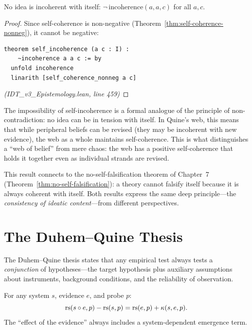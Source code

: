 \begin{theorem}
\label{thm:self-incoherence}
No idea is incoherent with itself: $\neg\,\mathrm{incoherence}(a, a, c)$ for all $a, c$.
\end{theorem}

\begin{proof}
Since self-coherence is non-negative (Theorem~\ref{thm:self-coherence-nonneg}),
it cannot be negative:
\begin{lstlisting}
theorem self_incoherence (a c : I) :
    ~incoherence a a c := by
  unfold incoherence
  linarith [self_coherence_nonneg a c]
\end{lstlisting}
\textit{(IDT\_v3\_Epistemology.lean, line 459)}
\end{proof}

\begin{interpretation}
The impossibility of self-incoherence is a formal analogue of the principle of
non-contradiction: no idea can be in tension with itself. In Quine's web, this
means that while peripheral beliefs can be revised (they may be incoherent with
new evidence), the web as a whole maintains self-coherence. This is what
distinguishes a ``web of belief'' from mere chaos: the web has a positive
self-coherence that holds it together even as individual strands are revised.

This result connects to the no-self-falsification theorem of Chapter~7
(Theorem~\ref{thm:no-self-falsification}): a theory cannot falsify itself
because it is always coherent with itself. Both results express the same
deep principle---the \emph{consistency of ideatic content}---from different
perspectives.
\end{interpretation}


\section{The Duhem--Quine Thesis}

The Duhem--Quine thesis states that any empirical test always tests a \emph{conjunction}
of hypotheses---the target hypothesis plus auxiliary assumptions about
instruments, background conditions, and the reliability of observation.

\begin{theorem}
\label{thm:duhem-quine}
For any system $s$, evidence $e$, and probe $p$:
\[
  \mathrm{rs}(s \circ e, p) - \mathrm{rs}(s, p) = \mathrm{rs}(e, p) + \kappa(s, e, p).
\]
The ``effect of the evidence'' always includes a system-dependent emergence term.
\end{theorem}

